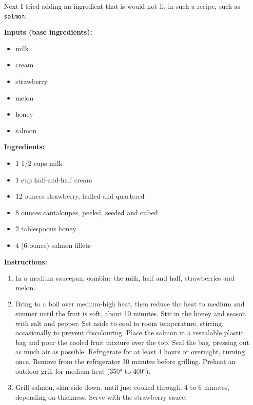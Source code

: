 Next I tried adding an ingredient that is would not fit in such a recipe, such as \texttt{salmon}:

\begin{tcolorbox}[recipebox={Grilled Salmon With Strawberry Sauce}]
	\textbf{Inputs (base ingredients):}
	\begin{itemize}
		\item milk
		\item cream
		\item strawberry
		\item melon
		\item honey
		\item salmon
	\end{itemize}

	\vspace{0.5em}
	\textbf{Ingredients:}
	\begin{itemize}
		\item 1 1/2 cups milk
		\item 1 cup half-and-half cream
		\item 12 ounces strawberry, hulled and quartered
		\item 8 ounces cantaloupes, peeled, seeded and cubed
		\item 2 tablespoons honey
		\item 4 (6-ounce) salmon fillets
	\end{itemize}

	\vspace{0.5em}
	\textbf{Instructions:}
	\begin{enumerate}
		\item In a medium saucepan, combine the milk, half and half, strawberries and melon.
		\item Bring to a boil over medium-high heat, then reduce the heat to medium and simmer until the fruit is soft, about 10 minutes. Stir in the honey and season with salt and pepper. Set aside to cool to room temperature, stirring occasionally to prevent discolouring. Place the salmon in a resealable plastic bag and pour the cooled fruit mixture over the top. Seal the bag, pressing out as much air as possible. Refrigerate for at least 4 hours or overnight, turning once. Remove from the refrigerator 30 minutes before grilling. Preheat an outdoor grill for medium heat (350° to 400°).
		\item Grill salmon, skin side down, until just cooked through, 4 to 6 minutes, depending on thickness. Serve with the strawberry sauce.
	\end{enumerate}
\end{tcolorbox}

